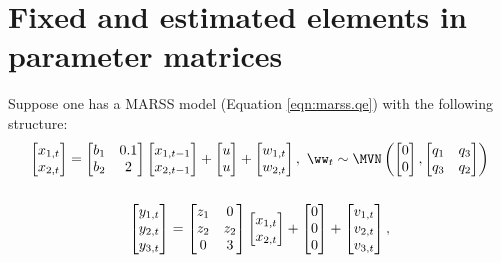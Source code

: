 \section{Fixed and estimated elements in parameter matrices}
Suppose one has a MARSS model (Equation \ref{eqn:marss.qe}) with the following structure:
\begin{gather*}
\begin{bmatrix}x_{1,t}\\x_{2,t}\end{bmatrix}
= \begin{bmatrix}b_1&0.1\\b_2&2\end{bmatrix}
\begin{bmatrix}x_{1,t-1}\\x_{2,t-1}\end{bmatrix}
+ \begin{bmatrix}u\\u\end{bmatrix}
+ \begin{bmatrix}w_{1,t}\\w_{2,t}\end{bmatrix},
 \textrm{ } \ww_t \sim \MVN\begin{pmatrix}\begin{bmatrix}0\\0\end{bmatrix},\begin{bmatrix}q_1&q_3\\q_3&q_2\end{bmatrix} \end{pmatrix}  \\
\\
\begin{bmatrix}y_{1,t}\\y_{2,t}\\y_{3,t}\end{bmatrix}
= \begin{bmatrix}z_1&0\\z_2&z_2\\0&3\end{bmatrix}
\begin{bmatrix}x_{1,t}\\x_{2,t}\end{bmatrix}
+ \begin{bmatrix}0\\0\\0\end{bmatrix}
+ \begin{bmatrix}v_{1,t}\\ v_{2,t}\\ v_{3,t}\end{bmatrix},

\end{gather*}
